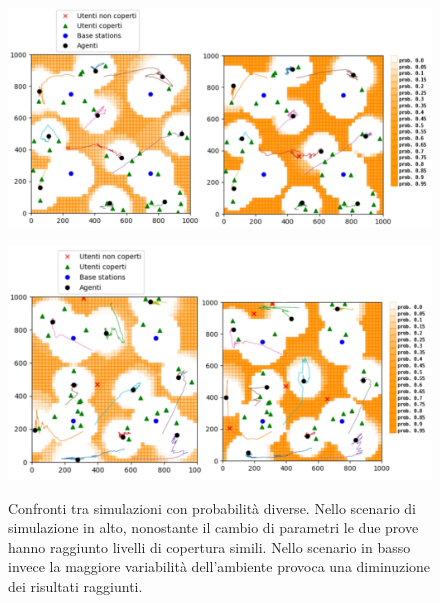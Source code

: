 \begin{figure}
    \centering
    \includegraphics[width=1\linewidth]{img/ch4/experiment3/esempio_exp3_1.jpg}
    \label{fig:esempio_exp3_1}

    \vspace*{0.5cm}
    
    \includegraphics[width=1\linewidth]{img/ch4/experiment3/esempio_exp3_2.jpg}
    \label{fig:esempio_exp3_2}
    \caption[Confronti tra simulazioni con probabilità diverse]{Confronti tra simulazioni con probabilità diverse. Nello scenario di simulazione in alto, nonostante il cambio di parametri le due prove hanno raggiunto livelli di copertura simili. Nello scenario in basso invece la maggiore variabilità dell'ambiente provoca una diminuzione dei risultati raggiunti.}
    
    
\end{figure}